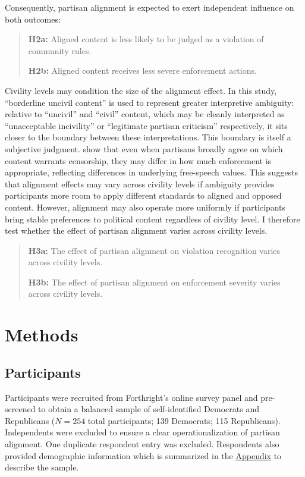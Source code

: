 \documentclass[12pt]{article}
\begin{document}
Consequently, partisan alignment is expected to exert independent influence on both outcomes:

\begin{quote}
\textbf{H2a:} Aligned content is less likely to be judged as a violation of community rules.

\textbf{H2b:} Aligned content receives less severe enforcement actions.
\end{quote}

Civility levels may condition the size of the alignment effect. In this study, \enquote{borderline uncivil content} is used to represent greater interpretive ambiguity: relative to \enquote{uncivil} and \enquote{civil} content, which may be cleanly interpreted as \enquote{unacceptable incivility} or \enquote{legitimate partisan criticism} respectively, it sits closer to the boundary between these interpretations. This boundary is itself a subjective judgment. \textcite{solomonIllusoryInterpartyDisagreement2024} show that even when partisans broadly agree on which content warrants censorship, they may differ in how much enforcement is appropriate, reflecting differences in underlying free-speech values. This suggests that alignment effects may vary across civility levels if ambiguity provides participants more room to apply different standards to aligned and opposed content. However, alignment may also operate more uniformly if participants bring stable preferences to political content regardless of civility level. I therefore test whether the effect of partisan alignment varies across civility levels.

\begin{quote}
\textbf{H3a:} The effect of partisan alignment on violation recognition varies across civility levels.

\textbf{H3b:} The effect of partisan alignment on enforcement severity varies across civility levels.
\end{quote}

\section{Methods}

\subsection{Participants}

Participants were recruited from Forthright's online survey panel and pre-screened to obtain a balanced sample of self-identified Democrats and Republicans ($N = 254$ total participants; 139 Democrats; 115 Republicans). Independents were excluded to ensure a clear operationalization of partisan alignment. One duplicate respondent entry was excluded. Respondents also provided demographic information which is summarized in the \hyperref[sec:descriptive]{Appendix} to describe the sample.
\end{document}
